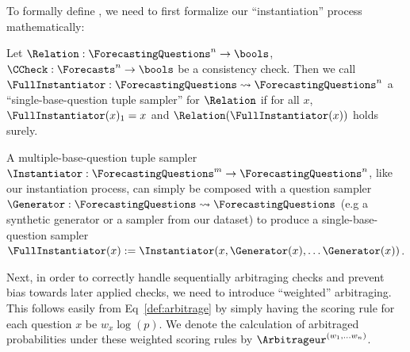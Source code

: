 \subsubsection{\CFCaster{}}
\label{cfc/app:cfcaster}

To formally define \CFCaster{}, we need to first formalize our ``instantiation'' process mathematically:

\begin{definition}
Let $\Relation:\ForecastingQuestions^n\to\bools$, $\CCheck:\Forecasts^n\to\bools$ be a consistency check. Then we call $\FullInstantiator:\ForecastingQuestions\rightsquigarrow\ForecastingQuestions^n$ a ``single-base-question tuple sampler'' for $\Relation$ if for all $x$, $\FullInstantiator(x)_1=x$ and $\Relation(\FullInstantiator(x))$ holds surely.
\label{def:instantiator}
\end{definition}

A multiple-base-question tuple sampler $\Instantiator:\ForecastingQuestions^m\to\ForecastingQuestions^n$, like our instantiation process, can simply be composed with a question sampler $\Generator:\ForecastingQuestions\rightsquigarrow\ForecastingQuestions$ (e.g a synthetic generator or a sampler from our dataset) to produce a single-base-question sampler $\FullInstantiator(x):=\Instantiator(x,\Generator(x),\dots\Generator(x))$.

Next, in order to correctly handle sequentially arbitraging checks and prevent bias towards later applied checks, we need to introduce ``weighted'' arbitraging. This follows easily from Eq~\ref{def:arbitrage} by simply having the scoring rule for each question $x$ be $w_x\log(p)$. We denote the calculation of arbitraged probabilities under these weighted scoring rules by $\Arbitrageur^{(w_1,\dots w_n)}$.

